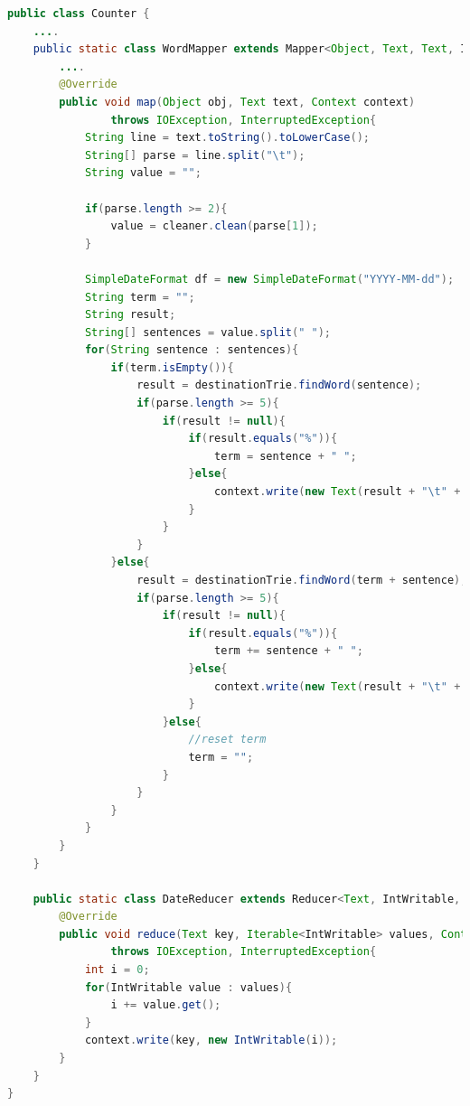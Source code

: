 \begin{lstlisting}[language=Java,basicstyle=\tiny,caption=Counter.java (MapReduce),label={lst:kode_mapreduce}]
public class Counter {
	....
    public static class WordMapper extends Mapper<Object, Text, Text, IntWritable>{
        ....
        @Override
        public void map(Object obj, Text text, Context context) 
                throws IOException, InterruptedException{
            String line = text.toString().toLowerCase();
            String[] parse = line.split("\t");
            String value = "";
            
            if(parse.length >= 2){
                value = cleaner.clean(parse[1]); 
            }
            
            SimpleDateFormat df = new SimpleDateFormat("YYYY-MM-dd");
            String term = "";
            String result;
            String[] sentences = value.split(" ");
            for(String sentence : sentences){
                if(term.isEmpty()){
                    result = destinationTrie.findWord(sentence);
                    if(parse.length >= 5){
                        if(result != null){
                            if(result.equals("%")){
                                term = sentence + " ";
                            }else{
                                context.write(new Text(result + "\t" + df.format(new Date(Long.parseLong(parse[parse.length - 1])))), new IntWritable(1));
                            }
                        }
                    }
                }else{
                    result = destinationTrie.findWord(term + sentence);
                    if(parse.length >= 5){
                        if(result != null){
                            if(result.equals("%")){
                                term += sentence + " ";
                            }else{
                                context.write(new Text(result + "\t" + df.format(new Date(Long.parseLong(parse[parse.length - 1])))), new IntWritable(1));
                            }
                        }else{
                            //reset term
                            term = "";
                        } 
                    }
                }
            }
        }
    }
    
    public static class DateReducer extends Reducer<Text, IntWritable, Text, IntWritable>{        
        @Override
        public void reduce(Text key, Iterable<IntWritable> values, Context context) 
                throws IOException, InterruptedException{
            int i = 0;
            for(IntWritable value : values){
                i += value.get();
            }            
            context.write(key, new IntWritable(i));
        }
    }
}
\end{lstlisting}

